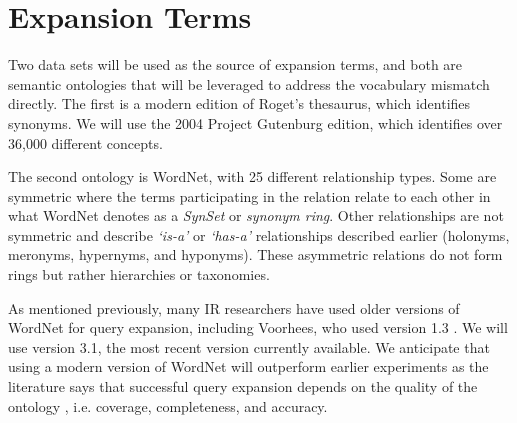 
















\section{Expansion Terms}
Two data sets will be used as the source of expansion terms, and both are semantic ontologies that will be leveraged to address the vocabulary mismatch directly. The first is a modern edition of Roget's thesaurus, which identifies synonyms. We will use the 2004 Project Gutenburg edition, which identifies over 36,000 different concepts. 


The second ontology is WordNet, with 25 different relationship types. Some are symmetric where the terms participating in the relation relate to each other in what WordNet denotes as a \textit{SynSet} or \textit{synonym ring}. Other relationships are not symmetric and describe \textit{`is-a'} or \textit{`has-a'} relationships described earlier (holonyms, meronyms, hypernyms, and hyponyms). These asymmetric relations do not form rings but rather hierarchies or taxonomies.

As mentioned previously, many IR researchers have used older versions of WordNet for query expansion, including Voorhees, who used version 1.3 \cite{Voorhees:1994:QEU:188490.188508}. We will use version 3.1, the most recent version currently available. We anticipate that using a modern version of WordNet will outperform earlier experiments as the literature says that successful query expansion   depends on the quality of the ontology \cite{kim1990model, jones1993thesaurus}, i.e. coverage, completeness, and accuracy.

